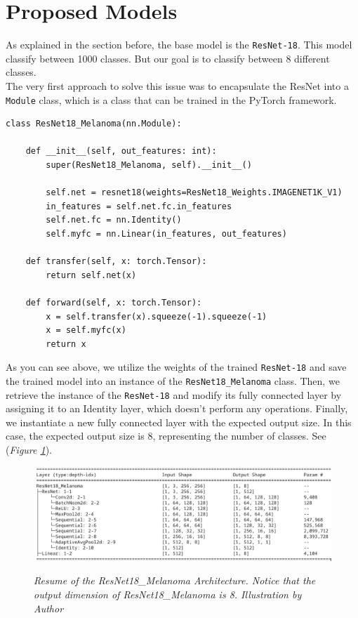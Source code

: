 \section{Proposed Models}

As explained in the section before, the base model is the {\tt ResNet-18}. This model classify
between 1000 classes. But our goal is to classify between 8 different classes. \\

The very first approach to solve this issue was to encapsulate the ResNet into a {\tt Module} class, which is a class that can be trained in the PyTorch framework.

\begin{Verbatim}[fontsize=\small]
class ResNet18_Melanoma(nn.Module):

    def __init__(self, out_features: int):
        super(ResNet18_Melanoma, self).__init__()

        self.net = resnet18(weights=ResNet18_Weights.IMAGENET1K_V1)
        in_features = self.net.fc.in_features
        self.net.fc = nn.Identity()
        self.myfc = nn.Linear(in_features, out_features)

    def transfer(self, x: torch.Tensor):
        return self.net(x)

    def forward(self, x: torch.Tensor):
        x = self.transfer(x).squeeze(-1).squeeze(-1)
        x = self.myfc(x)
        return x
\end{Verbatim}

As you can see above, we utilize the weights of the trained {\tt ResNet-18} and save the trained model into an instance of the {\tt ResNet18\_Melanoma} class. Then, we retrieve the instance of the {\tt ResNet-18} and modify its fully connected layer by assigning it to an Identity layer, which doesn't perform any operations. Finally, we instantiate a new fully connected layer with the expected output size. In this case, the expected output size is 8, representing the number of classes. See (\textit{Figure \ref{fig:resnet-18-melanoma-arch}}).

\begin{figure}[H]
\centering
\includegraphics[width=\textwidth]{imatges/methodological_contribution/ResNet18_Melanoma.png}
\caption[Resume of the ResNet18\_Melanoma Architecture]{\textit{Resume of the ResNet18\_Melanoma Architecture. Notice that the output dimension of ResNet18\_Melanoma is 8. Illustration by Author}}
{\label{fig:resnet-18-melanoma-arch}}
\end{figure}


